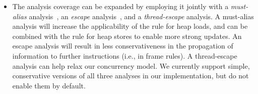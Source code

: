 \begin{itemize}

\item
  The analysis coverage can be expanded by employing it jointly with a
  \emph{must-alias} analysis~\cite{popl:1998:Jagannathan,popl:1993:Choi,popl:2008:Zheng}, an \emph{escape} analysis~\cite{popl:1998:Blanchet,popl:1996:Deutsch}, and a
  \emph{thread-escape} analysis. A must-alias analysis will increase
  the applicability of the rule for heap loads, and can be combined
  with the rule for heap stores to enable more strong updates. An
  escape analysis will result in less conservativeness in the
  propagation of information to further instructions (i.e., in frame
  rules). A thread-escape analysis can help relax our concurrency
  model. We currently support simple, conservative versions of all
  three analyses in our implementation, but do not enable them by default.

  



%



\end{itemize}
